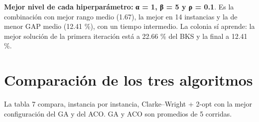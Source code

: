 \documentclass[11pt,letterpaper]{article}
\begin{document}
\textbf{Mejor nivel de cada hiperparámetro:} \textbf{α = 1, β = 5 y ρ = 0.1}. Es la combinación con mejor rango medio (1.67), la mejor en 14 instancias y la de menor GAP medio (12.41 \%), con un tiempo intermedio. La colonia sí aprende: la mejor solución de la primera iteración está a 22.66 \% del BKS y la final a 12.41 \%.

\hypertarget{comparaciuxf3n-de-los-tres-algoritmos}{%
\section{Comparación de los tres algoritmos}\label{comparaciuxf3n-de-los-tres-algoritmos}}

La tabla 7 compara, instancia por instancia, Clarke--Wright + 2-opt con la mejor configuración del GA y del ACO. GA y ACO son promedios de 5 corridas.
\end{document}
